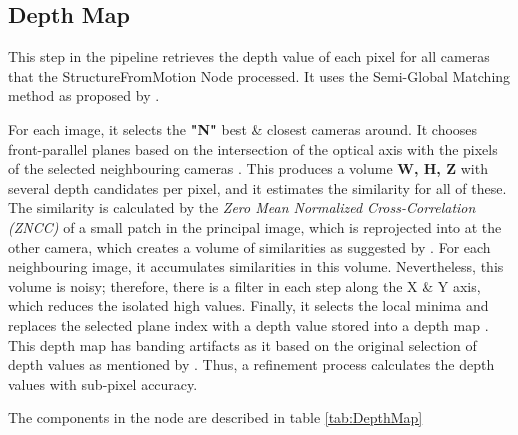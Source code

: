 \documentclass[12pt]{report}
\begin{document}
  \subsection{Depth Map}

  This step in the pipeline retrieves the depth value of each pixel for all cameras that the StructureFromMotion Node processed.
  It uses the Semi-Global Matching method as proposed by \citet*{Hirschmuller2005}.
  
  For each image, it selects the \textbf{"N"} best \& closest cameras around. It chooses front-parallel planes based on the intersection of the optical axis with the pixels of the selected neighbouring cameras .
  This produces a volume \textbf{W, H, Z} with several depth candidates per pixel, and it estimates the similarity for all of these. The similarity is calculated by the \textit{Zero Mean Normalized Cross-Correlation (ZNCC)}
  of a small patch in the principal image, which is reprojected into at the other camera, which creates a volume of similarities as suggested by .
  For each neighbouring image, it accumulates similarities in this volume. Nevertheless, this volume is noisy; therefore,  there is a filter in each step along the X \& Y axis, which reduces the isolated high values.
  Finally, it selects the local minima and replaces the selected plane index with a depth value stored into a depth map . This depth map has banding artifacts as it based on the original selection of depth values as mentioned by .
  Thus, a refinement process calculates the depth values with sub-pixel accuracy.
  
  The components in the node are described in table \ref{tab:DepthMap}
  
\end{document}
